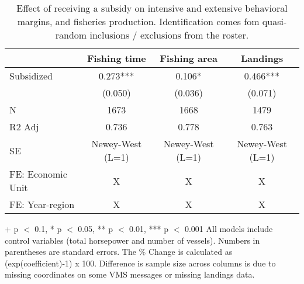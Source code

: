 \begin{table}

\caption{\label{tab:semi_elasticity}Effect of receiving a subsidy on intensive and extensive behavioral margins, and fisheries production. Identification comes fom quasi-random inclusions / exclusions from the roster.}
\centering
\begin{threeparttable}
\begin{tabular}[t]{lccc}
\toprule
  & Fishing time & Fishing area & Landings\\
\midrule
Subsidized & \num{0.273}*** & \num{0.106}* & \num{0.466}***\\
 & (\num{0.050}) & (\num{0.036}) & (\num{0.071})\\
\midrule
N & \num{1673} & \num{1668} & \num{1479}\\
R2 Adj & \num{0.736} & \num{0.778} & \num{0.763}\\
SE & Newey-West (L=1) & Newey-West (L=1) & Newey-West (L=1)\\
FE: Economic Unit & X & X & X\\
FE: Year-region & X & X & X\\
\bottomrule
\end{tabular}
\begin{tablenotes}
\item + p $<$ 0.1, * p $<$ 0.05, ** p $<$ 0.01, *** p $<$ 0.001 All models include control variables (total horsepower and number of vessels). Numbers in parentheses are standard errors. The \% Change is calculated as (exp(coefficient)-1) x 100. Difference is sample size across columns is due to missing coordinates on some VMS messages or missing landings data.
\end{tablenotes}
\end{threeparttable}
\end{table}
